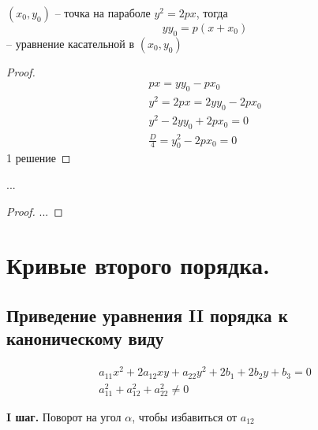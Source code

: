
\begin{theorem}
    $(x_0, y_0)$ -- точка на параболе $y^2=2px$, тогда
    \[yy_0 = p (x+x_0)\]
    -- уравнение касательной в $(x_0, y_0)$
\end{theorem}
\begin{proof}
    \begin{gather*}
        px = yy_0 - px_0\\
        y^2 = 2px = 2yy_0-2px_0\\
        y^2 - 2yy_0 + 2px_0 = 0\\
        \frac{D}{4} = y_0^2 - 2px_0 = 0
    \end{gather*}
    1 решение
\end{proof}
\begin{theorem}
    ...
\end{theorem}

\begin{proof}
    ...
\end{proof}

\chapter{Кривые второго порядка.}

\section{Приведение уравнения II порядка к каноническому виду}
\begin{gather*}
    a_{11} x^2 + 2 a_{12} xy + a_{22} y^2 + 2b_1 +2b_2y +b_3 = 0\\
    a_{11}^2 + a_{12}^2 + a_{22}^2 \neq 0
\end{gather*}

\textbf{I шаг. } Поворот на угол $\alpha$, чтобы избавиться от $a_{12}$

